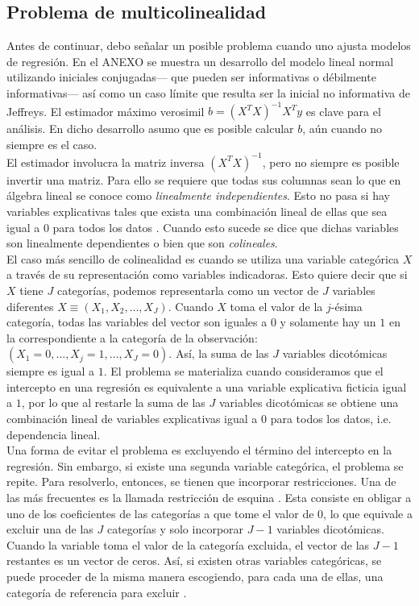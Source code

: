\subsection{Problema de multicolinealidad} \label{prob_multicolinealidad}

Antes de continuar, debo señalar un posible problema cuando uno ajusta modelos de regresión. En el {\color{Red} ANEXO} se muestra un desarrollo del modelo lineal normal utilizando iniciales conjugadas--- que pueden ser informativas o débilmente informativas--- así como un caso límite que resulta ser la inicial no informativa de Jeffreys. El estimador máximo verosimil $b=(X^TX)^{-1}X^Ty$ es clave para el análisis. En dicho desarrollo asumo que es posible calcular $b$, aún cuando no siempre es el caso.\\

El estimador involucra la matriz inversa $(X^TX)^{-1}$, pero no siempre es posible invertir una matriz. Para ello se requiere que todas sus columnas sean lo que en álgebra lineal se conoce como \textit{linealmente independientes}. Esto no pasa si hay variables explicativas tales que exista una combinación lineal de ellas que sea igual a $0$ para todos los datos \parencite{GelmanHill06}. Cuando esto sucede se dice que dichas variables son linealmente dependientes o bien que son \textit{colineales}.\\

El caso más sencillo de colinealidad es cuando se utiliza una variable categórica $X$ a través de su representación como variables indicadoras. Esto quiere decir que si $X$ tiene $J$ categorías, podemos representarla como un vector de $J$ variables diferentes $X \equiv (X_1,X_2,\dots,X_J)$. Cuando $X$ toma el valor de la $j$-ésima categoría, todas las variables del vector son iguales a $0$ y solamente hay un $1$ en la correspondiente a la categoría de la observación: $(X_1 = 0,\dots,X_j = 1,\dots,X_J=0)$. Así, la suma de las $J$ variables dicotómicas siempre es igual a $1$. El problema se materializa cuando consideramos que el intercepto en una regresión es equivalente a una variable explicativa ficticia igual a $1$, por lo que al restarle la suma de las $J$ variables dicotómicas se obtiene una combinación lineal de variables explicativas igual a $0$ para todos los datos, i.e. dependencia lineal.\\ 

Una forma de evitar el problema es excluyendo el término del intercepto en la regresión. Sin embargo, si existe una segunda variable categórica, el problema se repite. Para resolverlo, entonces, se tienen que incorporar restricciones. Una de las más frecuentes es la llamada restricción de esquina \parencite{Regueiro12}. Esta consiste en obligar a uno de los coeficientes de las categorías a que tome el valor de $0$, lo que equivale a excluir una de las $J$ categorías y solo incorporar $J-1$ variables dicotómicas. Cuando la variable toma el valor de la categoría excluida, el vector de las $J-1$ restantes es un vector de ceros. Así, si existen otras variables categóricas, se puede proceder de la misma manera escogiendo, para cada una de ellas, una categoría de referencia para excluir \parencite{GelmanHill06}.\\ 

